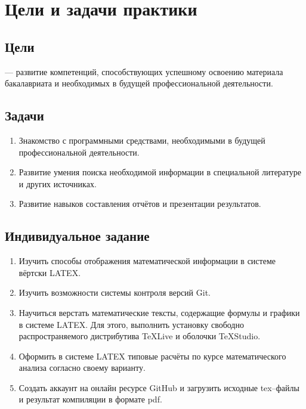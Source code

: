 \documentclass[12pt]{article}
\begin{document}
	
	
	
	\newpage
	\tableofcontents
	
	\newpage
	\section{Цели и задачи практики}
	
	\subsection{Цели}
	— развитие компетенций, способствующих успешному освоению материала бакалавриата и необходимых в будущей профессиональной деятельности.
	
	\subsection{Задачи}
	\begin{enumerate} 
		\item Знакомство с программными средствами, необходимыми в будущей профессиональной деятельности.
		\item Развитие умения поиска необходимой информации в специальной литературе и других источниках.
		\item Развитие навыков составления отчётов и презентации результатов.

	\end{enumerate}
	
	\subsection{Индивидуальное задание}
	\begin{enumerate} 
		\item Изучить способы отображения математической информации в системе вёртски LATEX.
		\item Изучить возможности системы контроля версий Git.
		\item Научиться верстать математические тексты, содержащие формулы и графики в системе LATEX. Для этого, выполнить установку свободно распространяемого дистрибутива TeXLive и оболочки TeXStudio.
		\item Оформить в системе LATEX типовые расчёты по курсе математического анализа согласно своему варианту.
		\item Создать аккаунт на онлайн ресурсе GitHub и загрузить исходные tex–файлы и результат компиляции в формате pdf.
	\end{enumerate}
	
\end{document}
